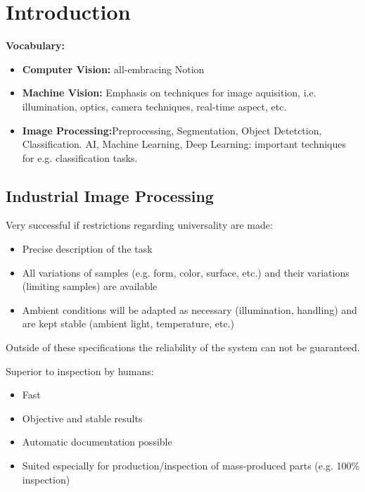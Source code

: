 \section{Introduction}
\textbf{Vocabulary:}
\begin{itemize}
    \item \textbf{Computer Vision:} all-embracing Notion
    \item \textbf{Machine Vision:} Emphasis on techniques for image aquisition, i.e. illumination, optics, camera techniques, real-time aspect, etc.
    \item \textbf{Image Processing:}Preprocessing, Segmentation, Object Detetction, Classification. AI, Machine Learning, Deep Learning: important techniques for e.g. classification tasks.
\end{itemize}

\subsection{Industrial Image Processing}
Very successful if restrictions regarding universality are made:
\begin{itemize}
    \item Precise description of the task
    \item All variations of samples (e.g. form, color, surface, etc.) and their variations (limiting samples) are available
    \item Ambient conditions will be adapted as necessary (illumination, handling) and are kept stable (ambient light, temperature, etc.)
\end{itemize}
Outside of these specifications the reliability of the system can not be guaranteed.

Superior to inspection by humans:
\begin{itemize}
    \item Fast
    \item Objective and stable results
    \item Automatic documentation possible
    \item Suited especially for production/inspection of mass-produced parts (e.g. 100\% inspection)
\end{itemize}

